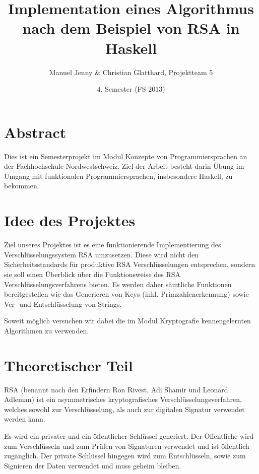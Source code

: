 \documentclass[a4paper, 11pt]{article} %
\title{Implementation eines Algorithmus nach dem Beispiel von RSA in Haskell}
\author{Manuel Jenny \& Christian Glatthard, Projektteam 5}
\date{4. Semester (FS 2013)}
\begin{document}
\maketitle
\thispagestyle{fancy}

\newpage

\tableofcontents	  	


\newpage
\setcounter{page}{1}


\section{Abstract}
Dies ist ein Semesterprojekt im Modul Konzepte von Programmiersprachen an der Fachhochschule Nordwestschweiz. Ziel der Arbeit besteht darin Übung im Umgang mit funktionalen Programmiersprachen, insbesondere Haskell, zu bekommen.

\section{Idee des Projektes}
Ziel unseres Projektes ist es eine funktionierende Implementierung des Verschlüsselungssystem RSA umzusetzen. Diese wird nicht den Sicherheitsstandards für produktive RSA Verschlüsselungen entsprechen, sondern sie soll einen Überblick über die Funktionsweise des RSA Verschlüsselungsverfahrens bieten. Es werden daher sämtliche Funktionen bereitgestellen wie das Generieren von Keys (inkl. Primzahlenerkennung) sowie Ver- und Entschlüsselung von Strings.

Soweit möglich versuchen wir dabei die im Modul Kryptografie kennengelernten Algorithmen zu verwenden.

\section{Theoretischer Teil}
RSA (benannt nach den Erfindern Ron Rivest, Adi Shamir und Leonard Adleman) ist ein asymmetrisches kryptografisches Verschlüsselungsverfahren, welches sowohl zur Verschlüsselung, als auch zur digitalen Signatur verwendet werden kann.

Es wird ein privater und ein öffentlicher Schlüssel generiert. Der Öffentliche wird zum Verschlüsseln und zum Prüfen von Signaturen verwendet und ist öffentlich zugänglich. Der private Schlüssel hingegen wird zum Entschlüsseln, sowie zum Signieren der Daten verwendet und muss geheim bleiben.
\end{document}

